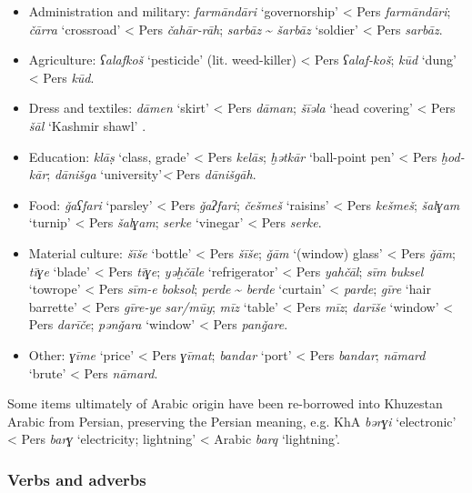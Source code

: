 \documentclass[output=paper,nonflat]{langsci/langscibook}
\begin{document}
\begin{itemize} 
\item[] Administration and military: \textit{farmāndāri} ‘governorship’ < Pers \textit{farmāndāri}; \textit{čārra} ‘crossroad’ < Pers \textit{čahār-rāh}; \textit{sarbāz} \~{} \textit{šarbāz} ‘soldier’ < Pers \textit{sarbāz}.
\item[] Agriculture: \textit{ʕalafkoš} ‘pesticide' (lit. weed-killer) < Pers \textit{ʕalaf-koš}; \textit{kūd} ‘dung’ < Pers \textit{kūd}. 
\item[] Dress and textiles: \textit{dāmen} ‘skirt’ < Pers \textit{dāman}; \textit{šīəla} ‘head covering’ < Pers \textit{šāl} ‘Kashmir shawl’ \citep[174]{Ingham2005}.
\item[] Education:  \textit{klāṣ} ‘class, grade’ < Pers \textit{kelās}; \textit{ḫətkār} ‘ball-point pen’ < Pers \textit{ḫod-kār}; \textit{dānišga} ‘university’\textit{<} Pers \textit{dānišgāh}.
\item[] Food: \textit{ǧaʕfari} ‘parsley’ < Pers \textit{ǧaʔfari}; \textit{češmeš} ‘raisins’ < Pers \textit{kešmeš}; \textit{šalɣam} ‘turnip’ < Pers \textit{šalɣam}; \textit{serke} ‘vinegar’ < Pers \textit{serke}.
\item[] Material culture: \textit{šīše} ‘bottle’ < Pers \textit{šīše}; \textit{ǧām} ‘(window) glass’ < Pers \textit{ǧām}; \textit{tīɣe} ‘blade’ < Pers \textit{tīɣe}; \textit{yəḫčāle} ‘refrigerator’ < Pers \textit{yahčāl}; \textit{sīm} \textit{buksel} ‘towrope’ < Pers \textit{sīm-e} \textit{boksol}; \textit{perde} \~{} \textit{berde} ‘curtain’ < \textit{parde}; \textit{gīre} ‘hair barrette’ < Pers \textit{gīre-ye} \textit{sar/mūy}; \textit{mīz} ‘table’ < Pers \textit{mīz}; \textit{darīše} ‘window’ < Pers \textit{darīče}; \textit{pənǧara} ‘window’ < Pers \textit{panǧare}.
\item[] Other: \textit{ɣīme} ‘price’ < Pers \textit{ɣīmat}; \textit{bandar} ‘port’ < Pers \textit{bandar}; \textit{nāmard} ‘brute’ < Pers \textit{nāmard}.
\end{itemize}

Some items ultimately of Arabic origin have been re-borrowed into Khuzestan Arabic from Persian, preserving the Persian meaning, e.g. KhA \textit{bərɣi} ‘electronic’ < Pers \textit{barɣ} ‘electricity; lightning’ < Arabic \textit{barq} ‘lightning’. 


\subsubsection{Verbs and adverbs} 
\end{document}
